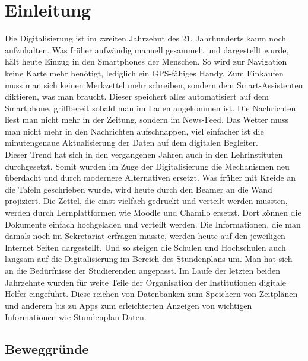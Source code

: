 \chapter{Einleitung}
\label{sec:einleitung}


Die Digitalisierung ist im zweiten Jahrzehnt des 21. Jahrhunderts kaum noch aufzuhalten. Was früher aufwändig manuell gesammelt und dargestellt wurde, hält heute Einzug in den Smartphones der Menschen. So wird zur Navigation keine Karte mehr benötigt, lediglich ein \ac{GPS}-fähiges Handy. Zum Einkaufen muss man sich keinen Merkzettel mehr schreiben, sondern dem Smart-Assistenten diktieren, was man braucht. Dieser speichert alles automatisiert auf dem Smartphone, griffbereit sobald man im Laden angekommen ist. Die Nachrichten liest man nicht mehr in der Zeitung, sondern im News-Feed. Das Wetter muss man nicht mehr in den Nachrichten aufschnappen, viel einfacher ist die minutengenaue Aktualisierung der Daten auf dem digitalen Begleiter.
\\
\linebreak
Dieser Trend hat sich in den vergangenen Jahren auch in den Lehrinstituten durchgesetzt. Somit wurden im Zuge der Digitalisierung die Mechanismen neu überdacht und durch modernere Alternativen ersetzt. Was früher mit Kreide an die Tafeln geschrieben wurde, wird heute durch den Beamer an die Wand projiziert. Die Zettel, die einst vielfach gedruckt und verteilt werden mussten, werden durch Lernplattformen wie Moodle und Chamilo ersetzt. Dort können die Dokumente einfach hochgeladen und verteilt werden. Die Informationen, die man damals noch im Sekretariat erfragen musste, werden heute auf den jeweiligen Internet Seiten dargestellt. Und so steigen die Schulen und Hochschulen auch langsam auf die Digitalisierung im Bereich des Stundenplans um. Man hat sich an die Bedürfnisse der Studierenden angepasst. Im Laufe der letzten beiden Jahrzehnte wurden für weite Teile der Organisation der Institutionen digitale Helfer eingeführt. Diese reichen von Datenbanken zum Speichern von Zeitplänen und anderem bis zu \acp{App} zum erleichterten Anzeigen von wichtigen Informationen wie Stundenplan Daten. 

\section{Beweggründe}

